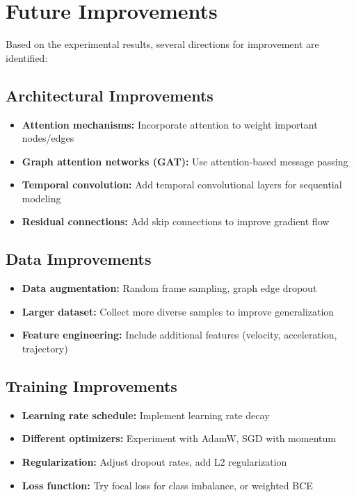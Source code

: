 \documentclass[11pt,a4paper]{article}
\begin{document}
\section{Future Improvements}

Based on the experimental results, several directions for improvement are identified:

\subsection{Architectural Improvements}
\begin{itemize}
    \item \textbf{Attention mechanisms:} Incorporate attention to weight important nodes/edges
    \item \textbf{Graph attention networks (GAT):} Use attention-based message passing
    \item \textbf{Temporal convolution:} Add temporal convolutional layers for sequential modeling
    \item \textbf{Residual connections:} Add skip connections to improve gradient flow
\end{itemize}

\subsection{Data Improvements}
\begin{itemize}
    \item \textbf{Data augmentation:} Random frame sampling, graph edge dropout
    \item \textbf{Larger dataset:} Collect more diverse samples to improve generalization
    \item \textbf{Feature engineering:} Include additional features (velocity, acceleration, trajectory)
\end{itemize}

\subsection{Training Improvements}
\begin{itemize}
    \item \textbf{Learning rate schedule:} Implement learning rate decay
    \item \textbf{Different optimizers:} Experiment with AdamW, SGD with momentum
    \item \textbf{Regularization:} Adjust dropout rates, add L2 regularization
    \item \textbf{Loss function:} Try focal loss for class imbalance, or weighted BCE
\end{itemize}
\end{document}
